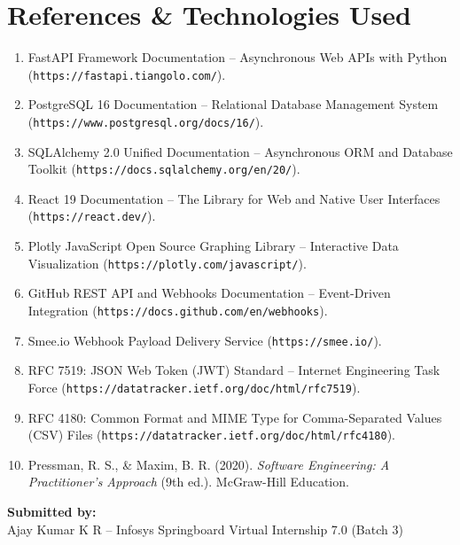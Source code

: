 \documentclass[11pt,a4paper]{article}
\providecommand{\url}[1]{\texttt{#1}}
\begin{document}
\section{References \& Technologies Used}
\begin{enumerate}
    \item FastAPI Framework Documentation -- Asynchronous Web APIs with Python (\url{https://fastapi.tiangolo.com/}).
    \item PostgreSQL 16 Documentation -- Relational Database Management System (\url{https://www.postgresql.org/docs/16/}).
    \item SQLAlchemy 2.0 Unified Documentation -- Asynchronous ORM and Database Toolkit (\url{https://docs.sqlalchemy.org/en/20/}).
    \item React 19 Documentation -- The Library for Web and Native User Interfaces (\url{https://react.dev/}).
    \item Plotly JavaScript Open Source Graphing Library -- Interactive Data Visualization (\url{https://plotly.com/javascript/}).
    \item GitHub REST API and Webhooks Documentation -- Event-Driven Integration (\url{https://docs.github.com/en/webhooks}).
    \item Smee.io Webhook Payload Delivery Service (\url{https://smee.io/}).
    \item RFC 7519: JSON Web Token (JWT) Standard -- Internet Engineering Task Force (\url{https://datatracker.ietf.org/doc/html/rfc7519}).
    \item RFC 4180: Common Format and MIME Type for Comma-Separated Values (CSV) Files (\url{https://datatracker.ietf.org/doc/html/rfc4180}).
    \item Pressman, R. S., \& Maxim, B. R. (2020). \textit{Software Engineering: A Practitioner's Approach} (9th ed.). McGraw-Hill Education.
\end{enumerate}

\vspace{1.5em}
\noindent\textbf{Submitted by:}\\
Ajay Kumar K R -- Infosys Springboard Virtual Internship 7.0 (Batch 3)
\end{document}
